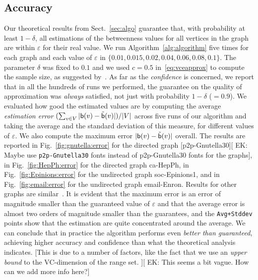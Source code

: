 \subsection{Accuracy}\label{sec:accuracy}
Our theoretical results from Sect.~\ref{sec:algo} guarantee that, with probability
at least $1-\delta$, all estimations of the betweenness values for all vertices
in the graph are within $\varepsilon$ for their real value. %
We run Algorithm~\ref{alg:algorithm} five times for each graph and each value of
$\varepsilon$ in $\{0.01, 0.015, 0.02, 0.04, 0.06, 0.08, 0.1\}$. The parameter
$\delta$ was fixed to $0.1$ and we used $c=0.5$ in~\eqref{eq:vceapprox} to
compute the sample size, as suggested by~\citet{LofflerP09}. As far as the
\emph{confidence} is concerned, we report that in all the hundreds of runs we
performed, the guarantee on the quality of approximation was \emph{always} satisfied, not just
with probability $1-\delta$ ($=0.9$). We evaluated how good the estimated values
are by computing the average \emph{estimation error} $(\sum_{v\in
V}|\mathsf{b}(v)-\tilde{\mathsf{b}}(v)|)/|V|$ across five runs of our algorithm and taking
the average and the standard deviation of this measure, for different values of
$\varepsilon$. We also compute the maximum error $|\mathsf{b}(v)-\tilde{\mathsf{b}}(v)|$
overall. The results are reported in Fig.~\ref{fig:gnutella:error} for the directed
graph [p2p-Gnutella30][ EK: Maybe use \texttt{p2p-Gnutella30} fonts instead of p2p-Gnutella30 fonts for the graphs], %
\ifproof
in Fig.~\ref{fig:HepPh:error} for the directed graph ca-HepPh, in
Fig.~\ref{fig:Epinions:error} for the undirected graph soc-Epinions1, %
\fi
and in Fig.~\ref{fig:email:error} for the undirected graph
email-Enron. %
\ifproof
\else
Results for other graphs are similar~\citep{RiondatoK13}. %
\fi
It is
evident that the maximum error is an error of magnitude smaller than the
guaranteed value of $\varepsilon$ and that the average error is almost two
orders of magnitude smaller than the guarantees, and the \texttt{Avg+Stddev}
points show that the estimation are quite concentrated around the
average. We can conclude that in practice the algorithm performs even \emph{better
than guaranteed}, achieving higher accuracy and confidence than what the
theoretical analysis indicates. [This is due to a number of factors, like the
fact that we use an \emph{upper bound} to the VC-dimension of the range set. ][ EK: This seems a bit vague. How can we add more info here?]


